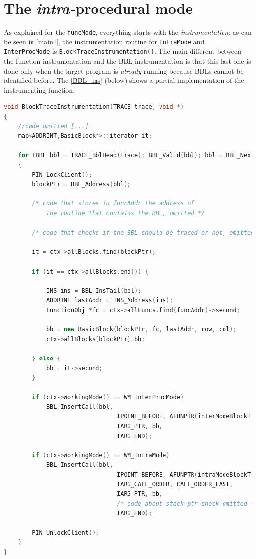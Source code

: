 \documentclass[a4paper,10pt]{report}
\begin{document}
\section{The \emph{intra-}procedural mode}

As explained for the \verb|funcMode|, everything starts with the \emph{instrumentation}:
as can be seen in \cref{main1}, the instrumentation routine for \verb|IntraMode| and \verb|InterProcMode| is \verb|BlockTraceInstrumentation()|. The main different between the 
function instrumentation and the BBL instrumentation is that this last one is done
only when the target program is \emph{already} running because BBLs cannot be 
identified before. The \cref{BBL_ins} (below) shows a partial implementation of the instrumenting function.


\begin{lstlisting}[language=C++, 
	caption={partial implementation of \texttt{BlockTraceInstrumentation()}}, 
	label=BBL_ins, frame=leftline, showstringspaces=false]
void BlockTraceInstrumentation(TRACE trace, void *)
{
	//code omitted [...]
	map<ADDRINT,BasicBlock*>::iterator it;

    for (BBL bbl = TRACE_BblHead(trace); BBL_Valid(bbl); bbl = BBL_Next(bbl))
    {
		PIN_LockClient();
 		blockPtr = BBL_Address(bbl);

		/* code that stores in funcAddr the address of 
			the routine that contains the BBL, omitted */

		/* code that checks if the BBL should be traced or not, omitted */

		it = ctx->allBlocks.find(blockPtr);

		if (it == ctx->allBlocks.end()) {

			INS ins = BBL_InsTail(bbl);
			ADDRINT lastAddr = INS_Address(ins);
			FunctionObj *fc = ctx->allFuncs.find(funcAddr)->second;

			bb = new BasicBlock(blockPtr, fc, lastAddr, row, col); 
			ctx->allBlocks[blockPtr]=bb;

		} else {		
			bb = it->second;
		}

		if (ctx->WorkingMode() == WM_InterProcMode)
			BBL_InsertCall(bbl, 
								IPOINT_BEFORE, AFUNPTR(interModeBlockTrace), 
								IARG_PTR, bb, 
								IARG_END);		

		if (ctx->WorkingMode() == WM_IntraMode)
			BBL_InsertCall(bbl, 
								IPOINT_BEFORE, AFUNPTR(intraModeBlockTrace), 
								IARG_CALL_ORDER, CALL_ORDER_LAST, 
								IARG_PTR, bb, 
								/* code about stack ptr check omitted */
								IARG_END);		

		PIN_UnlockClient();
    }
}

\end{lstlisting}
\end{document}
